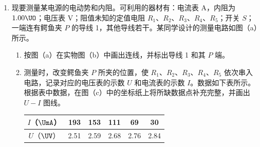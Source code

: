 \documentclass[\gkver]{gaokaozhenti}
\begin{document}
\begin{enumerate}
根据表中数据，完成下列填空：
\begin{enumerate}
	\item
	物块的加速度 $a=$$\Umsq$（保留 3 位有效数字）。
	\item
	因为，可知斜面是粗糙的。
\end{enumerate}

\item
现要测量某电源的电动势和内阻。可利用的器材有：电流表 A，内阻为 $1.00\UO$；电压表 V；阻值未知的定值电阻 $R_1$、$R_2$、$R_3$、$R_4$、$R_5$；开关 $S$；一端连有鳄鱼夹 $P$ 的导线 1，其他导线若干。某同学设计的测量电路如图（a）所示。



\begin{enumerate}
	\item
	按图（a）在实物图（b）中画出连线，并标出导线 1 和其 $P$ 端。
	\item
	测量时，改变鳄鱼夹 $P$ 所夹的位置，使 $R_1$、$R_2$、$R_3$、$R_4$、$R_5$ 依次串入电路，记录对应的电压表的示数 $U$ 和电流表的示数 $I$。数据如下表所示。根据表中数据，在图（c）中的坐标纸上将所缺数据点补充完整，并画出 $U-I$ 图线。

	\begin{center}
	\begin{tabular}{|c|c|c|c|c|c|}
	\hline
	$I$（$\UmA$） & 193 & 153 & 111 & 69 & 30 \\ \hline
	$U$（$\UV$） & 2.51 & 2.59 & 2.68 & 2.76 & 2.84 \\ \hline
	\end{tabular}
	\end{center}


\end{enumerate}
\end{enumerate}
\end{document}
